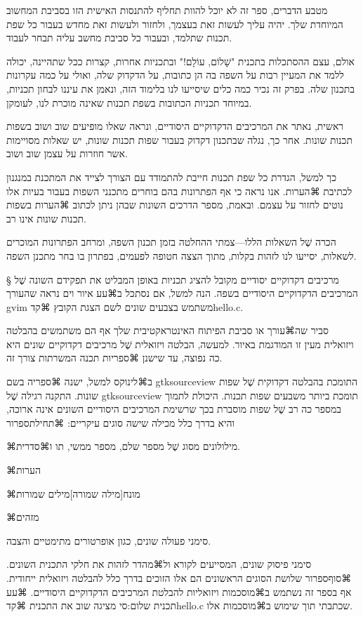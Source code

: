 מטבע הדברים, ספר זה לא יוכל להוות תחליף להתנסות האישית הזו בסביבת המחשוב
המיוחדת שלך. יהיה עליך לעשות זאת בעצמך, ולחזור ולעשות זאת מחדש בעבור כל שפת
תכנות שתלמד, ובעבור כל סביבת מחשב עליה תבחר לעבוד.

אולם, עצם ההסתכלות בתכנית "שָׁלוֹם, עוֹלָם!" ובתכניות אחרות, קצרות ככל שתהיינה,
יכולה ללמד את המעיין רבות על השפה בה הן כתובות, על הדקדוק שלה, ואולי על כמה
עקרונות בתכנון שלה. בפרק זה נכיר כמה כלים שיסייעו לנו בלימוד הזה, ונאמן את
עיננו לבחון תכניות, במיוחד תכניות הכתובות בשפת תכנות שאינה מוכרת לנו, לעומקן.

ראשית, נאתר את המרכיבים הדקדוקיים היסודיים, ונראה שאלו מופיעים שוב ושוב בשפות
תכנות שונות. אחר כך, נגלה שבתכנון דקדוק בעבור שפות תכנות שונות, יש שאלות
מסויימות אשר חוזרות על עצמן שוב ושוב.

כך למשל, הגדרת כל שפת תכנות חייבת להתמודד עם הצורך לצייד את המתכנת במנגנון
לכתיבת ⌘הערות. אנו נראה כי אף הפתרונות בהם בוחרים מתכנני השפות בעבור בעיות אלו
נוטים לחזור על עצמם. ובאמת, מספר הדרכים השונות שבהן ניתן לכתוב ⌘הערות בשפות
תכנות שונות אינו רב.

הכרה שֶׁל השאלות הללו---צמתי ההחלטה בזמן תכנון השפה, ומרחב הפתרונות המוכרים
לשאלות, יסייעו לנו לזהות בקלות, מתוך הצצה חטופה לפעמים, בפתרון בו בחר מתכנן
השפה.

§ מרכיבים דקדוקיים יסודיים
מקובל להציג תכניות באופן המבליט את תפקידם השונה שֶׁל המרכיבים הדקדוקיים היסודיים
בשפה. הנה למשל, אם נסתכל ב⌘עע איור וים נראה שהעורך gvim משתמש בצבעים שונים לשם
הצגת הקובץ ⌘קד{hello.c}.

סביר שה⌘עורך או סביבת הפיתוח האינטראקטיבית שלך אף הם משתמשים בהבלטה ויזואלית
מעין זו המודגמת באיור. למעשה, הבלטה ויזואלית שֶׁל מרכיבים דקדוקיים שונים היא כה
נפוצה, עד שישנן ⌘ספריות תכנה המשרתות צורך זה.

ב⌘לינוקס למשל, ישנה ⌘ספריה בשם gtksourceview התומכת בהבלטה דקדוקית שֶׁל שפות
שונות. התקנה רגילה שֶׁל gtksourceview תומכת ביותר משבעים שפות תכנות. היכולת
לתמוך במספר כה רב שֶׁל שפות מוסברת בכך שרשימת המרכיבים היסודיים השונים אינה
ארוכה, והיא בדרך כלל מכילה שישה סוגים עיקריים:
⌘תחילת{ספרור}
\item ⌘מילולונים מסוג שֶׁל מספר שלם, מספר ממשי, תו ו⌘סדרית.
\item ⌘הערות
\item ⌘מונח[מילה שמורה]{מילים שמורות}
\item ⌘מזהים
\item סימני פעולה שונים, כגון אופרטורים מתימטיים והצבה.
\item סימני פיסוק שונים, המסייעים לקורא ול⌘מהדר לזהות את חלקי התכנית השונים.
⌘סוף{ספרור}
שלושת הסוגים הראשונים הם אלו הזוכים בדרך כלל להבלטה ויזואלית ייחודית. אף בספר
זה נשתמש ב⌘מוסכמות ויזואליות להבלטת המרכיבים הדקדוקיים היסודיים. ⌘עע תכנית
שלום:סי מציגה שוב את התכנית ⌘קד{hello.c} שכתבתי תוך שימוש ב⌘מוסכמות אלו.

